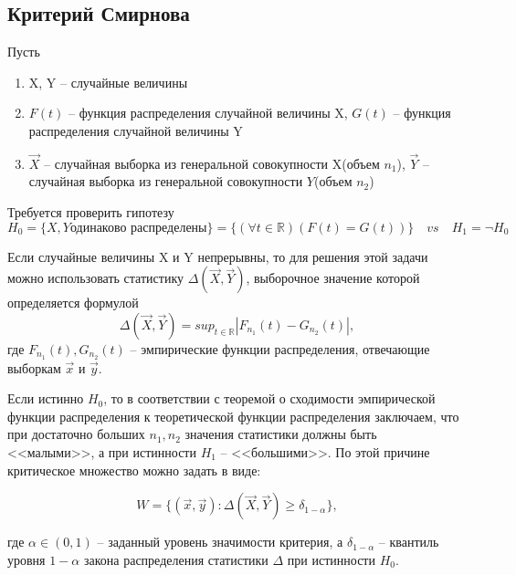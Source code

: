 \documentclass[a4paper, 12pt]{article}
\theoremstyle{definition}
\theoremstyle{leads}
\theoremstyle{example}
\theoremstyle{remark}
\begin{document}
\subsection{Критерий Смирнова}

Пусть 
\begin{enumerate}
	\item X, Y -- случайные величины
	\item $F(t)$ -- функция распределения случайной величины X, 
	$G(t)$ -- функция распределения случайной величины  Y
	\item $\vec{X}$ -- случайная выборка из генеральной совокупности X(объем $n_1$), $\vec{Y}$ -- случайная выборка из генеральной совокупности $Y$(объем $n_2$)
\end{enumerate}

Требуется проверить гипотезу
\begin{equation*}
H_0 = \{X, Y \text{одинаково распределены}\} = \{(\forall t \in \mathbb{R}) (F(t) = G(t))\} \quad vs \quad H_1 = \neg H_0 
\end{equation*} 

Если случайные величины X и Y непрерывны, то для решения этой задачи можно использовать статистику $\Delta(\vec{X}, \vec{Y})$, выборочное значение которой определяется формулой 
\begin{equation}
	\Delta(\vec{X}, \vec{Y}) = sup_{t \in \mathbb{R}} |F_{n_1}(t) - G_{n_2}(t)|,
\end{equation}
где $F_{n_1}(t), G_{n_2}(t)$ -- эмпирические функции распределения, отвечающие выборкам $\vec{x}$ и $\vec{y}$.

Если истинно $H_0$, то в соответствии с теоремой о сходимости эмпирической функции распределения к теоретической функции распределения заключаем, что при достаточно больших  $n_1, n_2$ значения статистики должны быть <<малыми>>, а при истинности $H_1$ -- <<большими>>. По этой причине критическое множество можно задать в виде:

\begin{equation*}
	W = \{(\vec{x}, \vec{y}) : \Delta(\vec{X}, \vec{Y}) \geq \delta_{1 - \alpha}\},
\end{equation*}

где $\alpha \in (0,1)$ -- заданный уровень значимости критерия, а $\delta_{1 - \alpha}$ -- квантиль уровня $1 - \alpha$ закона распределения статистики $\Delta$ при истинности  $H_0$.
\end{document}
